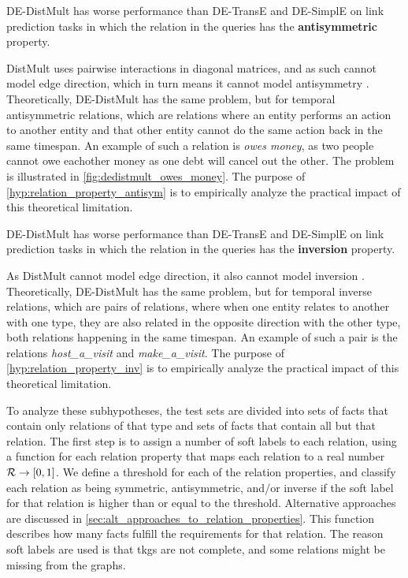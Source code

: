 

\begin{subhypothesis}
\label{hyp:relation_property_antisym}
DE-DistMult has worse performance than DE-TransE and DE-SimplE on link prediction tasks in which the relation in the queries has the \textbf{antisymmetric} property.
\end{subhypothesis}

DistMult uses pairwise interactions in diagonal matrices, and as such cannot model edge direction, which in turn means it cannot model antisymmetry \cite{goel19diachronicemb}. Theoretically, DE-DistMult has the same problem, but for temporal antisymmetric relations, which are relations where an entity performs an action to another entity and that other entity cannot do the same action back in the same timespan. 
An example of such a relation is \textit{owes money}, as two people cannot owe eachother money as one debt will cancel out the other.
The problem is illustrated in \autoref{fig:dedistmult_owes_money}.
The purpose of \autoref{hyp:relation_property_antisym} is to empirically analyze the practical impact of this theoretical limitation.



\begin{subhypothesis}
\label{hyp:relation_property_inv}
DE-DistMult has worse performance than DE-TransE and DE-SimplE on link prediction tasks in which the relation in the queries has the \textbf{inversion} property.
\end{subhypothesis}

As DistMult cannot model edge direction, it also cannot model inversion \cite{goel19diachronicemb}. Theoretically, DE-DistMult has the same problem, but for temporal inverse relations, which are pairs of relations, where when one entity relates to another with one type, they are also related in the opposite direction with the other type, both relations happening in the same timespan. An example of such a pair is the relations \textit{host\_a\_visit} and \textit{make\_a\_visit}. The purpose of \autoref{hyp:relation_property_inv} is to empirically analyze the practical impact of this theoretical limitation.

To analyze these subhypotheses, the test sets are divided into sets of facts that contain only relations of that type and sets of facts that contain all but that relation. The first step is to assign a number of soft labels to each relation, using a function for each relation property that maps each relation to a real number $\mathcal{R} \rightarrow [ 0 , 1 ]$. 
We define a threshold for each of the relation properties, and classify each relation as being symmetric, antisymmetric, and/or inverse if the soft label for that relation is higher than or equal to the threshold.
Alternative approaches are discussed in \autoref{sec:alt_approaches_to_relation_properties}. This function describes how many facts fulfill the requirements for that relation. The reason soft labels are used is that \glspl{tkg} are not complete, and some relations might be missing from the graphs.

